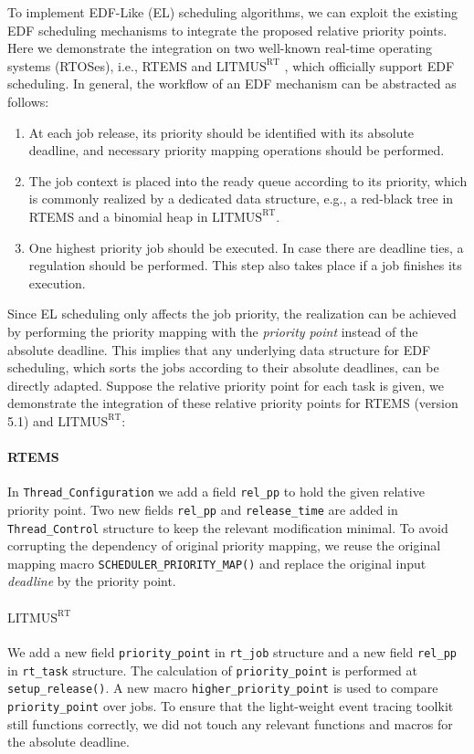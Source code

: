 \documentclass[conference]{IEEEtran}
\theoremstyle{definition}
\theoremstyle{remark}
\begin{document}
To implement EDF-Like (EL) scheduling algorithms, we can exploit the existing EDF scheduling mechanisms to integrate the proposed relative priority points.
	Here we demonstrate the integration on two well-known real-time operating systems (RTOSes), i.e., RTEMS \cite{rtems} and {$\text{LITMUS}^{\text{RT}}$} \cite{litmusrt}, which officially support EDF scheduling.
	In general, the workflow of an EDF mechanism can be abstracted as follows:
	\begin{enumerate}
		\item At each job release, its priority should be identified with its absolute deadline, and necessary priority mapping operations should be performed. 
		\item The job context is placed into the ready queue according to its priority, which is commonly realized by a dedicated data structure, e.g., a red-black tree in RTEMS and a binomial heap in {$\text{LITMUS}^{\text{RT}}$}.
		\item One highest priority job should be executed. In case there are deadline ties, a regulation should be performed. This step also takes place if a job finishes its execution.
	\end{enumerate}
	Since EL scheduling only affects the job priority, the realization can be achieved by performing the priority mapping with the \emph{priority point} instead of the absolute deadline. This implies that  any underlying data structure for EDF scheduling, which sorts the jobs according to their absolute deadlines, can be directly adapted.
	Suppose the relative priority point for each task is given, we demonstrate the integration of these relative priority points for RTEMS (version 5.1) and {$\text{LITMUS}^{\text{RT}}$}:
	
	\paragraph{RTEMS} 
	In \texttt{Thread\_Configuration} we add a field \texttt{rel\_pp} to hold the given relative priority point.
	Two new fields \texttt{rel\_pp} and \texttt{release\_time} are added in \texttt{Thread\_Control} structure to keep the relevant modification minimal.
	To avoid corrupting the dependency of original priority mapping, we reuse the original mapping macro \texttt{SCHEDULER\_PRIORITY\_MAP()} and replace the original input \emph{deadline} by the priority point.
	
	\paragraph{{$\text{LITMUS}^{\text{RT}}$}} We add a new field \texttt{priority\_point} in \texttt{rt\_job} structure and a new field \texttt{rel\_pp} in \texttt{rt\_task} structure. 
	The calculation of \texttt{priority\_point} is performed at \texttt{setup\_release()}. 
	A new macro \texttt{higher\_priority\_point} is used to compare \texttt{priority\_point} over jobs.
	To ensure that the light-weight event tracing toolkit~\cite{Brandenburg07feather-trace:a} still functions correctly, we did not touch any relevant functions and macros for the absolute deadline.
	
\end{document}
